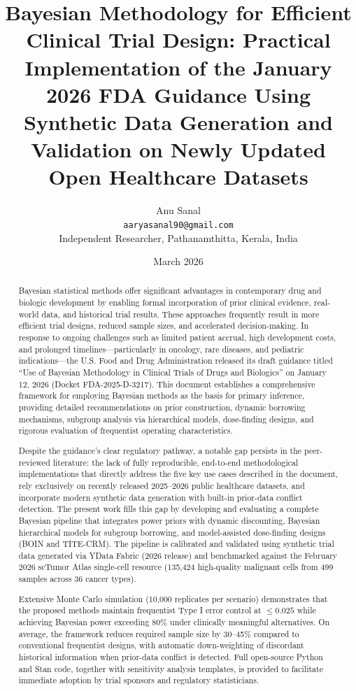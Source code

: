\documentclass[11pt,a4paper,twoside]{article}
\title{Bayesian Methodology for Efficient Clinical Trial Design: Practical Implementation of the January 2026 FDA Guidance Using Synthetic Data Generation and Validation on Newly Updated Open Healthcare Datasets}
\author{Anu Sanal \\
\texttt{aaryasanal90@gmail.com} \\
Independent Researcher, Pathanamthitta, Kerala, India}
\date{March 2026}
\begin{document}
\maketitle

\begin{abstract}
Bayesian statistical methods offer significant advantages in contemporary drug and biologic development by enabling formal incorporation of prior clinical evidence, real-world data, and historical trial results. These approaches frequently result in more efficient trial designs, reduced sample sizes, and accelerated decision-making. In response to ongoing challenges such as limited patient accrual, high development costs, and prolonged timelines—particularly in oncology, rare diseases, and pediatric indications—the U.S. Food and Drug Administration released its draft guidance titled ``Use of Bayesian Methodology in Clinical Trials of Drugs and Biologics'' on January 12, 2026 (Docket FDA-2025-D-3217). This document establishes a comprehensive framework for employing Bayesian methods as the basis for primary inference, providing detailed recommendations on prior construction, dynamic borrowing mechanisms, subgroup analysis via hierarchical models, dose-finding designs, and rigorous evaluation of frequentist operating characteristics.

Despite the guidance’s clear regulatory pathway, a notable gap persists in the peer-reviewed literature: the lack of fully reproducible, end-to-end methodological implementations that directly address the five key use cases described in the document, rely exclusively on recently released 2025–2026 public healthcare datasets, and incorporate modern synthetic data generation with built-in prior-data conflict detection. The present work fills this gap by developing and evaluating a complete Bayesian pipeline that integrates power priors with dynamic discounting, Bayesian hierarchical models for subgroup borrowing, and model-assisted dose-finding designs (BOIN and TITE-CRM). The pipeline is calibrated and validated using synthetic trial data generated via YData Fabric (2026 release) and benchmarked against the February 2026 scTumor Atlas single-cell resource (135,424 high-quality malignant cells from 499 samples across 36 cancer types).

Extensive Monte Carlo simulation (10,000 replicates per scenario) demonstrates that the proposed methods maintain frequentist Type I error control at $\leq 0.025$ while achieving Bayesian power exceeding 80\% under clinically meaningful alternatives. On average, the framework reduces required sample size by 30–45\% compared to conventional frequentist designs, with automatic down-weighting of discordant historical information when prior-data conflict is detected. Full open-source Python and Stan code, together with sensitivity analysis templates, is provided to facilitate immediate adoption by trial sponsors and regulatory statisticians.
\end{abstract}
\end{document}
